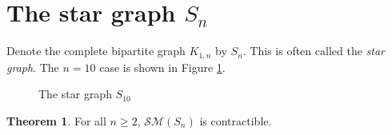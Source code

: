 \documentclass{amsart}
\theoremstyle{definition}
\newtheorem{theorem}{Theorem}[section]
\newcommand{\sm}{{\mathcal{SM}}}
\begin{document}
\section{The star graph $S_n$}\label{sec:star}
Denote the complete bipartite graph $K_{1,n}$ by $S_n$. This is often called the {\em star graph}. The $n=10$ case is shown in Figure \ref{fig:star}.

\begin{figure}
   

    \caption{\label{fig:star} The star graph $S_{10}$}
\end{figure}

\begin{theorem}\label{startheorem}
    For all $n\ge 2$, $\sm(S_n)$ is contractible.
\end{theorem}
\end{document}
